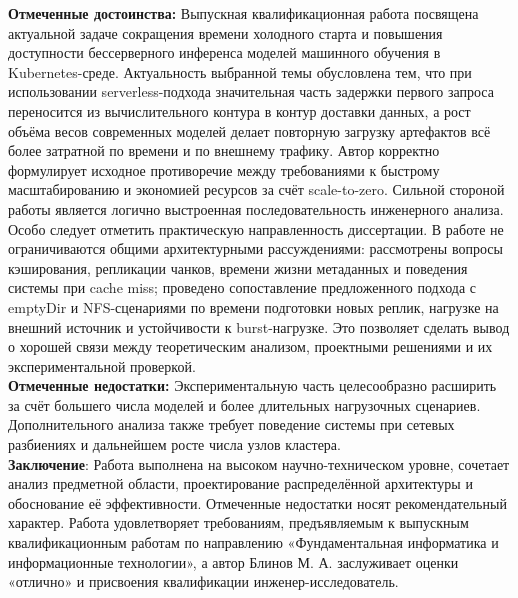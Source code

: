 \documentclass[master, fontsize=12pt]{diploma}
\begin{document}
\fillReviewHeader
\setlength{\parskip}{0pt}
\sloppy

\textbf{Отмеченные достоинства:} Выпускная квалификационная работа посвящена актуальной задаче сокращения времени холодного старта и повышения доступности бессерверного инференса моделей машинного обучения в Kubernetes-среде. Актуальность выбранной темы обусловлена тем, что при использовании serverless-подхода значительная часть задержки первого запроса переносится из вычислительного контура в контур доставки данных, а рост объёма весов современных моделей делает повторную загрузку артефактов всё более затратной по времени и по внешнему трафику. Автор корректно формулирует исходное противоречие между требованиями к быстрому масштабированию и экономией ресурсов за счёт scale-to-zero. Сильной стороной работы является логично выстроенная последовательность инженерного анализа. Особо следует отметить практическую направленность диссертации. В работе не ограничиваются общими архитектурными рассуждениями: рассмотрены вопросы кэширования, репликации чанков, времени жизни метаданных и поведения системы при cache miss; проведено сопоставление предложенного подхода с emptyDir и NFS-сценариями по времени подготовки новых реплик, нагрузке на внешний источник и устойчивости к burst-нагрузке. Это позволяет сделать вывод о хорошей связи между теоретическим анализом, проектными решениями и их экспериментальной проверкой.
\\

\textbf{Отмеченные недостатки:} Экспериментальную часть целесообразно расширить за счёт большего числа моделей и более длительных нагрузочных сценариев. Дополнительного анализа также требует поведение системы при сетевых разбиениях и дальнейшем росте числа узлов кластера.
\\

\textbf{Заключение}: Работа выполнена на высоком научно-техническом уровне, сочетает анализ предметной области, проектирование распределённой архитектуры и обоснование её эффективности. Отмеченные недостатки носят рекомендательный характер. Работа удовлетворяет требованиям, предъявляемым к выпускным квалификационным работам по направлению «Фундаментальная информатика и информационные технологии», а автор Блинов М. А. заслуживает оценки «отлично»  и присвоения квалификации инженер-исследователь.

\makeReviewSignature
\end{document}
